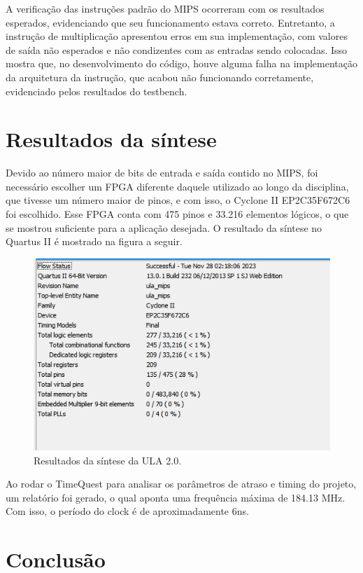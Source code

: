 \documentclass[conference]{IEEEtran}
\begin{document}
A verificação das instruções padrão do MIPS ocorreram com os resultados esperados, evidenciando que seu funcionamento estava correto. Entretanto, a instrução de multiplicação apresentou erros em sua implementação, com valores de saída não esperados e não condizentes com as entradas sendo colocadas. Isso mostra que, no desenvolvimento do código, houve alguma falha na implementação da arquitetura da instrução, que acabou não funcionando corretamente, evidenciado pelos resultados do testbench.

\section{Resultados da síntese}
Devido ao número maior de bits de entrada e saída contido no MIPS, foi necessário escolher um FPGA diferente daquele utilizado ao longo da disciplina, que tivesse um número maior de pinos, e com isso, o Cyclone II EP2C35F672C6 foi escolhido. Esse FPGA conta com 475 pinos e 33.216 elementos lógicos, o que se mostrou suficiente para a aplicação desejada. O resultado da síntese no Quartus II é mostrado na figura a seguir.

\begin{figure}[htbp]
\centerline{\includegraphics[scale=0.6]{io_report.png}}
\caption{Resultados da síntese da ULA 2.0.}
\label{fig}
\end{figure}

Ao rodar o TimeQuest para analisar os parâmetros de atraso e timing do projeto, um relatório foi gerado, o qual aponta uma frequência máxima de 184.13 MHz. Com isso, o período do clock é de aproximadamente 6ns.

\section{Conclusão}
\end{document}
